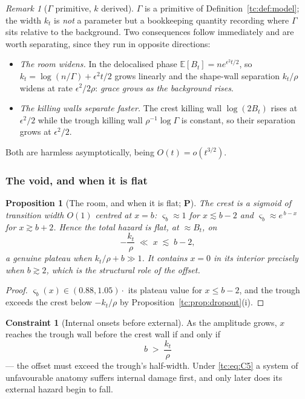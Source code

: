 \documentclass[11pt]{article}
\numberwithin{equation}{section}
\theoremstyle{plain}
\newtheorem{proposition}[theorem]{Proposition}
\theoremstyle{definition}
\newtheorem{constraint}{Constraint}
\theoremstyle{remark}
\newtheorem{remark}[theorem]{Remark}
\newcommand{\E}{\mathbb{E}}
\begin{document}
\begin{remark}[$\Gamma$ primitive, $k$ derived]\label{tc:rem:kderived}
$\Gamma$ is a primitive of Definition~\ref{tc:def:model}; the width
$k_t$ is \emph{not} a parameter but a bookkeeping quantity recording
where $\Gamma$ sits relative to the background. Two consequences follow
immediately and are worth separating, since they run in opposite
directions:
\begin{itemize}[itemsep=1pt]
\item \emph{The room widens.} In the delocalised phase
$\E[B_t]=ne^{\epsilon^{2}t/2}$, so $k_t=\log(n/\Gamma)+\epsilon^{2}t/2$
grows linearly and the shape-wall separation $k_t/\rho$ widens at rate
$\epsilon^{2}/2\rho$: \emph{grace grows as the background rises}.
\item \emph{The killing walls separate faster.} The crest killing wall
$\log(2B_t)$ rises at $\epsilon^{2}/2$ while the trough killing wall
$\rho^{-1}\log\Gamma$ is constant, so their separation grows at
$\epsilon^{2}/2$.
\end{itemize}
Both are harmless asymptotically, being $O(t)=o(t^{3/2})$.
\end{remark}

\subsubsection{The void, and when it is flat}\label{tc:subsub:void}

\begin{proposition}[The room, and when it is flat; \textbf{P}]
\label{tc:prop:flat}
The crest is a sigmoid of transition width $O(1)$ centred at $x=b$:
$\varsigma_b\approx1$ for $x\lesssim b-2$ and $\varsigma_b\approx
e^{\,b-x}$ for $x\gtrsim b+2$. Hence the total hazard is flat, at
$\approx B_t$, on
\begin{equation}\label{tc:eq:flat}
-\frac{k_t}{\rho}\;\ll\;x\;\lesssim\;b-2 ,
\end{equation}
a genuine plateau when $k_t/\rho+b\gg1$. It contains $x=0$ in its
interior precisely when $b\gtrsim2$, which is the structural role of the
offset.
\end{proposition}

\begin{proof}
$\varsigma_b(x)\in(0.88,1.05)\cdot$ its plateau value for
$x\le b-2$, and the trough exceeds the crest below $-k_t/\rho$ by
Proposition~\ref{tc:prop:dropout}(i).
\end{proof}

\begin{constraint}[Internal onsets before external]\label{tc:C5}
As the amplitude grows, $x$ reaches the trough wall before the crest
wall if and only if
\begin{equation}\label{tc:eq:C5}
\boxed{\;b\;>\;\frac{k_t}{\rho}\;}
\end{equation}
--- the offset must exceed the trough's half-width. Under
\eqref{tc:eq:C5} a system of unfavourable anatomy suffers internal
damage first, and only later does its external hazard begin to fall.
\end{constraint}
\end{document}
